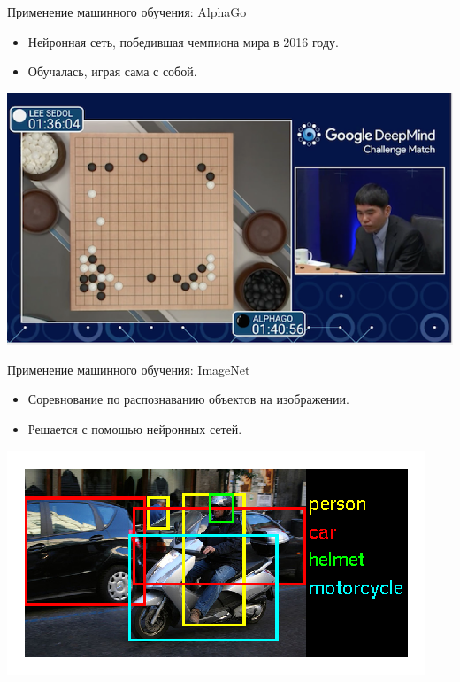 \documentclass[c, handout]{beamer} %
\begin{document}
	\begin{frame}{Применение машинного обучения: AlphaGo}
		 \begin{itemize}
		 	\item Нейронная сеть, победившая чемпиона мира в 2016 году.
		 	\item Обучалась, играя сама с собой.
		 \end{itemize}
	 \begin{center}
	 	\href{https://www.cbsnews.com/news/human-champ-stunned-as-computer-wins-at-go/}{\includegraphics[width=\linewidth]{go.png}} \\	 		
	 \end{center}
 	\end{frame}
 
 	\begin{frame}{Применение машинного обучения: ImageNet}
 		\begin{itemize}
 			\item Соревнование по распознаванию объектов на изображении.
 			\item Решается с помощью нейронных сетей.
 		\end{itemize}
 	 \begin{center}
 		\href{http://www.image-net.org/challenges/LSVRC/2014/}{\includegraphics[width=\linewidth]{in.png}}
 	\end{center}
 	\end{frame}
 
\end{document}
